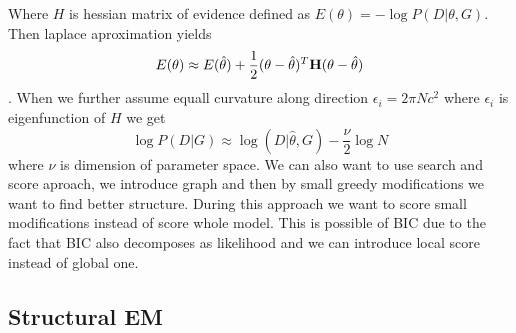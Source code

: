 \documentclass[12pt,a4paper]{article}
\begin{document}
Where $H$ is hessian matrix of evidence defined as $E(\theta)=-\log{P(D|\theta,G)}$. Then laplace aproximation yields
\begin{equation*}
    E(\theta)\approx E(\hat{\theta})+\frac{1}{2}(\theta-\hat{\theta})^{T}\vb{H}(\theta-\hat{\theta})
\end{equation*}. When we further assume equall curvature along direction $\epsilon_i=2\pi N c^2$ where $\epsilon_i$ is eigenfunction of $H$ we get
\begin{equation*}
    \log{P(D|G)}\approx \log(D|\hat{\theta},G)-\frac{\nu}{2}\log{N}
\end{equation*}
where $\nu$ is dimension of parameter space. We can also want to use search and score aproach, we introduce graph and then by small greedy modifications we want to
find better structure. During this approach we want to score small modifications instead of score whole model. This is possible of BIC due to the fact that
BIC also decomposes as likelihood and we can introduce local score instead of global one.
\subsection{Structural EM}
\end{document}

